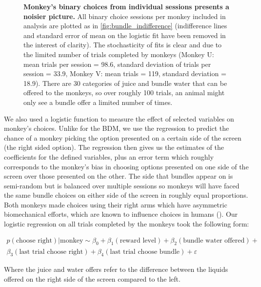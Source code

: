 \begin{figure}[htbp!] 
\centering    

\caption[Monkey's binary choices from individual sessions presents a noisier picture.]{\textbf{Monkey's binary choices from individual sessions presents a noisier picture.} All binary choice sessions per monkey included in analysis are plotted as in \ref{fig:bundle_indifference} (indifference lines and standard error of mean on the logistic fit have been removed in the interest of clarity). The stochasticity of fits is clear and due to the limited number of trials completed by monkeys (Monkey U: mean trials per session = 98.6, standard deviation of trials per session = 33.9, Monkey V: mean trials = 119, standard deviation = 18.9). There are 30 categories of juice and bundle water that can be offered to the monkeys, so over roughly 100 trials, an animal might only see a bundle offer a limited number of times.}
\label{fig:bundle_sessions}
\end{figure}

We also used a logistic function to measure the effect of selected variables on monkey’s choices. Unlike for the BDM, we use the regression to predict the chance of a monkey picking the option presented on a certain side of the screen (the right sided option). The regression then gives us the estimates of the coefficients for the defined variables, plus an error term which roughly corresponds to the monkey’s bias in choosing options presented on one side of the screen over those presented on the other. The side that bundles appear on is semi-random but is balanced over multiple sessions so monkeys will have faced the same bundle choices on either side of the screen in roughly equal proportions. Both monkeys made choices using their right arms which have asymmetric biomechanical efforts, which are known to influence choices in humans (\cite{cosInfluencePredictedArm2011}). Our logistic regression on all trials completed by the monkeys took the following form:

\begin{align}
p(\text{choose right}) | \text{monkey} \sim \beta_0 + \beta_1(\text{reward level}) + \beta_2(\text{bundle water offered}) + \nonumber \\ 
 \beta_3(\text{last trial choose right}) +  \beta_4(\text{last trial choose bundle}) + \varepsilon
\label{eq:logistic_regression}
\end{align}

Where the juice and water offers refer to the difference between the liquids offered on the right side of the screen compared to the left.


